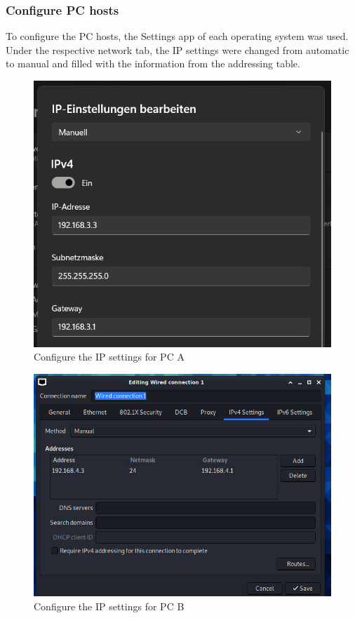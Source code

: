 \documentclass[a4paper]{article}
\begin{document}
\subsubsection{Configure PC hosts}
To configure the PC hosts, the Settings app of each operating system was used. Under the respective network tab, the IP settings were changed from automatic to manual and filled with the information from the addressing table.
\begin{figure}[h]
	\includegraphics[scale=0.4]{images/ipconfmar.png}
	\centering
	\caption{Configure the IP settings for PC A}
\end{figure}
\begin{figure}[h]
	\includegraphics[scale=0.27]{images/ipconfich.png}
	\centering
	\caption{Configure the IP settings for PC B}
\end{figure}
\newpage
\end{document}
